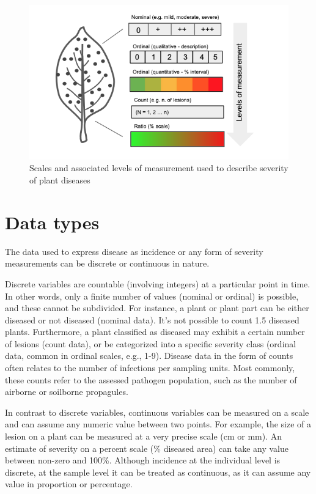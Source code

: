 \documentclass[
  letterpaper,
  DIV=11,
  numbers=noendperiod]{scrreprt}
\begin{document}
\begin{figure}

{\centering \includegraphics[width=5.32292in,height=\textheight]{imgs/severity.png}

}

\caption{\label{fig-severity}Scales and associated levels of measurement
used to describe severity of plant diseases}

\end{figure}

\hypertarget{data-types}{%
\section{Data types}\label{data-types}}

The data used to express disease as incidence or any form of severity
measurements can be discrete or continuous in nature.

Discrete variables are countable (involving integers) at a particular
point in time. In other words, only a finite number of values (nominal
or ordinal) is possible, and these cannot be subdivided. For instance, a
plant or plant part can be either diseased or not diseased (nominal
data). It's not possible to count 1.5 diseased plants. Furthermore, a
plant classified as diseased may exhibit a certain number of lesions
(count data), or be categorized into a specific severity class (ordinal
data, common in ordinal scales, e.g., 1-9). Disease data in the form of
counts often relates to the number of infections per sampling units.
Most commonly, these counts refer to the assessed pathogen population,
such as the number of airborne or soilborne propagules.

In contrast to discrete variables, continuous variables can be measured
on a scale and can assume any numeric value between two points. For
example, the size of a lesion on a plant can be measured at a very
precise scale (cm or mm). An estimate of severity on a percent scale (\%
diseased area) can take any value between non-zero and 100\%. Although
incidence at the individual level is discrete, at the sample level it
can be treated as continuous, as it can assume any value in proportion
or percentage.
\end{document}
